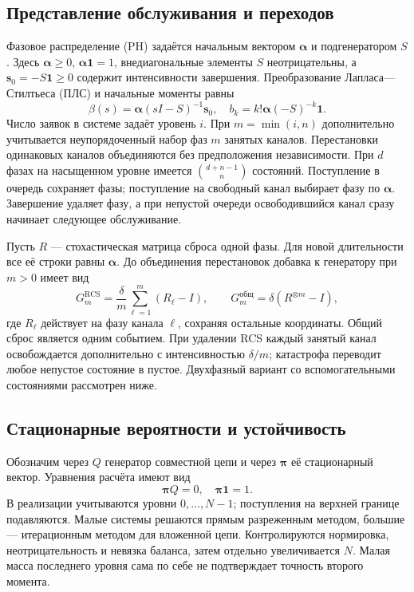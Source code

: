 \subsection{Представление обслуживания и переходов}
Фазовое распределение (PH) задаётся начальным вектором \(\boldsymbol\alpha\) и подгенератором \(S\). Здесь \(\boldsymbol\alpha\ge0\), \(\boldsymbol\alpha\mathbf1=1\), внедиагональные элементы \(S\) неотрицательны, а \(\boldsymbol s_0=-S\mathbf1\ge0\) содержит интенсивности завершения. Преобразование Лапласа—Стилтьеса (ПЛС) и начальные моменты равны
\[
\beta(s)=\boldsymbol\alpha(sI-S)^{-1}\boldsymbol s_0,\quad
b_k=k!\boldsymbol\alpha(-S)^{-k}\mathbf1.
\]
Число заявок в системе задаёт уровень \(i\). При \(m=\min(i,n)\) дополнительно учитывается неупорядоченный набор фаз \(m\) занятых каналов. Перестановки одинаковых каналов объединяются без предположения независимости. При \(d\) фазах на насыщенном уровне имеется \(\binom{d+n-1}{n}\) состояний. Поступление в очередь сохраняет фазы; поступление на свободный канал выбирает фазу по \(\boldsymbol\alpha\). Завершение удаляет фазу, а при непустой очереди освободившийся канал сразу начинает следующее обслуживание.

Пусть \(R\) --- стохастическая матрица сброса одной фазы. Для новой длительности все её строки равны \(\boldsymbol\alpha\). До объединения перестановок добавка к генератору при \(m>0\) имеет вид
\[
G_m^{\mathrm{RCS}}=\frac{\delta}{m}\sum_{\ell=1}^{m}(R_\ell-I),\qquad
G_m^{\text{общ}}=\delta(R^{\otimes m}-I),
\]
где \(R_\ell\) действует на фазу канала \(\ell\), сохраняя остальные координаты. Общий сброс является одним событием. При удалении RCS каждый занятый канал освобождается дополнительно с интенсивностью \(\delta/m\); катастрофа переводит любое непустое состояние в пустое. Двухфазный вариант со вспомогательными состояниями рассмотрен ниже.

\subsection{Стационарные вероятности и устойчивость}
Обозначим через \(Q\) генератор совместной цепи и через \(\boldsymbol\pi\) её стационарный вектор. Уравнения расчёта имеют вид
\[
\boldsymbol\pi Q=0,\quad \boldsymbol\pi\mathbf1=1.
\]
В реализации учитываются уровни \(0,\ldots,N-1\); поступления на верхней границе подавляются. Малые системы решаются прямым разреженным методом, большие --- итерационным методом для вложенной цепи. Контролируются нормировка, неотрицательность и невязка баланса, затем отдельно увеличивается \(N\). Малая масса последнего уровня сама по себе не подтверждает точность второго момента.

